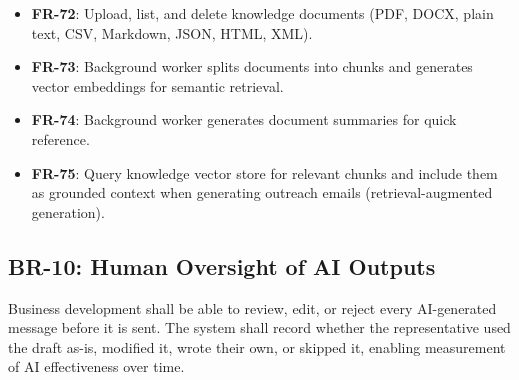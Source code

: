 \documentclass[a4paper]{article}
\begin{document}
\begin{itemize}
    \item \textbf{FR-72}: Upload, list, and delete knowledge
    documents (PDF, DOCX, plain text, CSV, Markdown, JSON, HTML, XML).
    \item \textbf{FR-73}: Background worker splits documents into
    chunks and generates vector embeddings for semantic retrieval.
    \item \textbf{FR-74}: Background worker generates document
    summaries for quick reference.
    \item \textbf{FR-75}: Query knowledge vector store for relevant
    chunks and include them as grounded context when generating
    outreach emails (retrieval-augmented generation).
\end{itemize}

\subsection{BR-10: Human Oversight of AI Outputs}

Business development shall be able to review, edit, or reject every
AI-generated message before it is sent. The system shall record
whether the representative used the draft as-is, modified it, wrote
their own, or skipped it, enabling measurement of AI effectiveness
over time.
\end{document}
